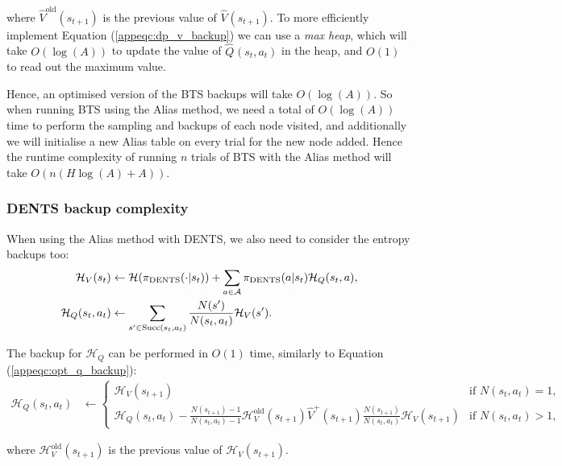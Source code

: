 \documentclass{article}
\newcommand{\cl}[1]{\mathcal{#1}}
\newcommand{\Vt}[2]{\hat{V}^{#2}(#1)}
\newcommand{\Qt}[3]{\hat{Q}^{#3}(#1,#2)}
\newcommand{\succc}[2]{\textnormal{Succ}(#1,#2)}
\theoremstyle{plain}
\begin{document}
\begin{appendices}
	        where $\Vt{s_{t+1}}{\text{old}}$ is the previous value of $\Vt{s_{t+1}}{}$. To more efficiently implement Equation (\ref{appeqc:dp_v_backup}) we can use a \textit{max heap}, which will take $O(\log(A))$ to update the value of $\Qt{s_t}{a_t}{}$ in the heap, and $O(1)$ to read out the maximum value. 
	        
	        Hence, an optimised version of the BTS backups will take $O(\log(A))$. So when running BTS using the Alias method, we need a total of $O(\log(A))$ time to perform the sampling and backups of each node visited, and additionally we will initialise a new Alias table on every trial for the new node added. Hence the runtime complexity of running $n$ trials of BTS with the Alias method will take $O(n(H\log(A)+A))$.
	        
	    \subsubsection{DENTS backup complexity}
	    
	    		When using the Alias method with DENTS, we also need to consider the entropy backups too:
	        \begin{align}
	            \cl{H}_V(s_t) &\leftarrow \cl{H}(\pi_{\textnormal{DENTS}}(\cdot | s_t)) + \sum_{a\in\cl{A}} \pi_{\textnormal{DENTS}}(a|s_t)\cl{H}_Q(s_t,a), \label{appeqc:entropy_v} \\
	            \cl{H}_Q(s_t,a_t) &\leftarrow \sum_{s'\in \succc{s_t}{a_t}} \frac{N(s')}{N(s_t,a_t)} \cl{H}_V(s').  \label{appeqc:entropy_q}
	        \end{align}
	        
	        The backup for $\cl{H}_Q$ can be performed in $O(1)$ time, similarly to Equation (\ref{appeqc:opt_q_backup}):
	        \begin{align}
	            \cl{H}_Q(s_t,a_t) &\leftarrow 
				\begin{cases}
					\cl{H}_V(s_{t+1}) & \text{if } N(s_t,a_t) = 1, \\
					\cl{H}_Q(s_t,a_t) - \frac{N(s_{t+1})-1}{N(s_t,a_t)-1} \cl{H}_V^{\text{old}}(s_{t+1}) \Vt{s_{t+1}} + \frac{N(s_{t+1})}{N(s_t,a_t)} \cl{H}_V(s_{t+1}) & \text{if } N(s_t,a_t) > 1,
				\end{cases}	\label{appeqc:opt_entq_backup}
	        \end{align}
	        
	        where $\cl{H}_V^{\text{old}}(s_{t+1})$ is the previous value of $\cl{H}_V(s_{t+1})$.
	        

\end{appendices}
\end{document}
